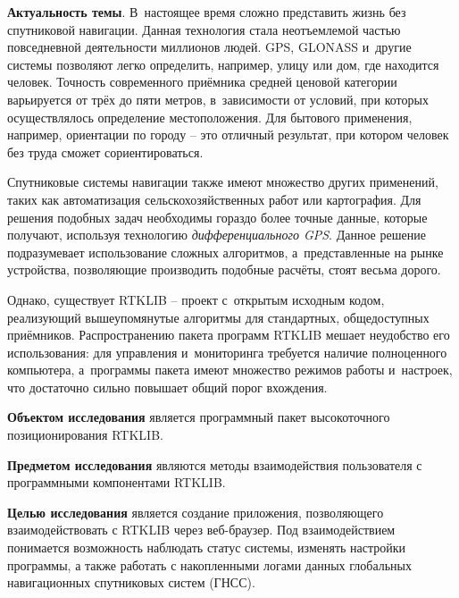 
\textbf{Актуальность темы}. В~настоящее время сложно представить жизнь без спутниковой навигации. Данная технология стала неотъемлемой частью повседневной деятельности миллионов людей. GPS, GLONASS и~другие системы позволяют легко определить, например, улицу или дом, где находится человек. Точность современного приёмника средней ценовой категории варьируется от трёх до пяти метров, в~зависимости от условий, при которых осуществлялось определение местоположения. Для бытового применения, например, ориентации по городу -- это отличный результат, при котором человек без труда сможет сориентироваться. \par

Спутниковые системы навигации также имеют множество других применений, таких как автоматизация сельскохозяйственных работ или картография. Для решения подобных задач необходимы гораздо более точные данные, которые получают, используя технологию \textit{дифференциального GPS}. Данное решение подразумевает использование сложных алгоритмов, а~представленные на рынке устройства, позволяющие производить подобные расчёты, стоят весьма дорого. \par

Однако, существует RTKLIB -- проект с~открытым исходным кодом, реализующий вышеупомянутые алгоритмы для стандартных, общедоступных приёмников. Распространению пакета программ RTKLIB мешает неудобство его использования: для управления и~мониторинга требуется наличие полноценного компьютера, а~программы пакета имеют множество режимов работы и~настроек, что достаточно сильно повышает общий порог вхождения. \par

\textbf{Объектом исследования} является программный пакет высокоточного позиционирования RTKLIB. \par

\textbf{Предметом исследования} являются методы взаимодействия пользователя с программными компонентами RTKLIB. \par

\textbf{Целью исследования} является создание приложения, позволяющего взаимодействовать с RTKLIB через веб-браузер. Под взаимодействием понимается возможность наблюдать статус системы, изменять настройки программы, а также работать с накопленными логами данных глобальных навигационных спутниковых систем (ГНСС). \par